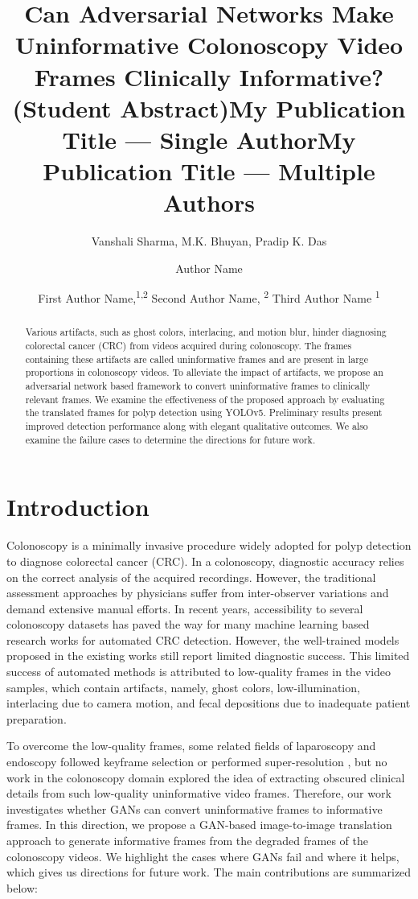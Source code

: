 \documentclass[letterpaper]{article} %
\title{Can Adversarial Networks Make Uninformative Colonoscopy Video Frames Clinically Informative? (Student Abstract)}
\author{
    Vanshali Sharma,
    M.K. Bhuyan,
    Pradip K. Das
}
\title{My Publication Title --- Single Author}
\author {
    Author Name
}
\title{My Publication Title --- Multiple Authors}
\author {
    First Author Name,\textsuperscript{\rm 1,\rm 2}
    Second Author Name, \textsuperscript{\rm 2}
    Third Author Name \textsuperscript{\rm 1}
}
\begin{document}
\maketitle

\begin{abstract}
Various artifacts, such as ghost colors, interlacing, and motion blur, hinder diagnosing colorectal cancer (CRC) from videos acquired during colonoscopy. The frames containing these artifacts are called uninformative frames and are present in large proportions in colonoscopy videos. To alleviate the impact of artifacts,  we propose an adversarial network based framework to convert uninformative frames to clinically relevant frames. We examine the effectiveness of the proposed approach by evaluating the translated frames for polyp detection using YOLOv5. Preliminary results present improved detection performance along with elegant qualitative outcomes. We also examine the failure cases to determine the directions for future work.
\end{abstract}

\section{Introduction}

Colonoscopy is a minimally invasive procedure widely adopted for polyp detection to diagnose colorectal cancer (CRC). In a colonoscopy, diagnostic accuracy relies on the correct analysis of the acquired recordings. However, the traditional assessment approaches by physicians suffer from inter-observer variations and demand extensive manual efforts. In recent years, accessibility to several colonoscopy datasets has paved the way for many machine learning based research works for automated CRC detection. However, the well-trained models proposed in the existing works still report limited diagnostic success. This limited success of automated methods is attributed to low-quality frames in the video samples, which contain artifacts, namely, ghost colors, low-illumination, interlacing due to camera motion, and fecal depositions due to inadequate patient preparation.

\par To overcome the low-quality frames, some related fields of laparoscopy and endoscopy followed keyframe selection \cite{ma2020keyframe} or performed super-resolution \cite{almalioglu2020endol2h}, but no work in the colonoscopy domain explored the idea of extracting obscured clinical details from such low-quality uninformative video frames. Therefore, our work investigates whether GANs can convert uninformative frames to informative frames. In this direction, we propose a GAN-based image-to-image translation approach to generate informative frames from the degraded frames of the colonoscopy videos. We highlight the cases where GANs fail and where it helps, which gives us directions for future work.
The main contributions are summarized below:
\end{document}
